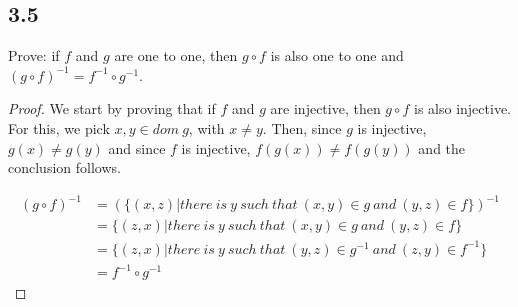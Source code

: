 \subsection*{3.5} Prove: if $f$ and $g$ are one to one, then $g \circ f$ is also one to one and $(g \circ f)^{-1} = f^{-1} \circ g^{-1}$.

\begin{proof}
    We start by proving that if $f$ and $g$ are injective, then $g \circ f$ is also injective. For this, we pick $x, y \in dom~g$, with $x \neq y$. Then, since $g$ is injective, $g(x) \neq g(y)$ and since $f$ is injective, $f(g(x)) \neq f(g(y))$ and the conclusion follows.
    
    \vspace{1em}
    
    \begin{align*}
        (g \circ f)^{-1} &= (\{(x,z) | there~is~y~such~that~(x,y) \in g~and~(y, z) \in f\})^{-1} \\  
   &= \{(z,x) | there~is~y~such~that~(x,y) \in g~and~(y, z) \in f\} \\
   &= \{(z,x) | there~is~y~such~that~(y,z) \in g^{-1}~and~(z, y) \in f^{-1}\} \\
   &= f^{-1} \circ g^{-1}
    \end{align*} 
\end{proof}

